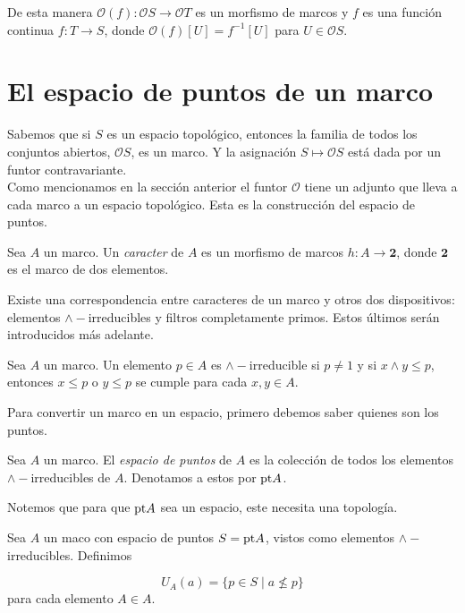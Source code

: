 De esta manera $\mathcal{O}(f)\colon \mathcal{O}S\to \mathcal{O}T$ es un morfismo de marcos y $f$ es una función continua $f\colon T\to S$, donde $\mathcal{O}(f)[U]=f^{-1}[U]$ para $U\in \mathcal{O}S$.

\section{El espacio de puntos de un marco}\label{Epuntos}

Sabemos que si $S$ es un espacio topológico, entonces la familia de todos los conjuntos abiertos, $\mathcal{O}S$, es un marco. Y la asignación $S\mapsto \mathcal{O}S$ está dada por un funtor contravariante.\\

Como mencionamos en la sección anterior el funtor $\mathcal{O}$ tiene un adjunto que lleva a cada marco a un espacio topológico. Esta es la construcción del espacio de puntos.

\begin{dfn}
    Sea $A$ un marco. Un \emph{caracter} de $A$ es un morfismo de marcos $h\colon A\to \mathbf{2}$, donde $\mathbf{2}$ es el marco de dos elementos.
\end{dfn}

Existe una correspondencia entre caracteres de un marco y otros dos dispositivos: elementos $\wedge-$irreducibles y filtros completamente primos. Estos últimos serán introducidos más adelante.

\begin{dfn}\label{infirre}
    Sea $A$ un marco. Un elemento $p\in A$ es $\wedge-$irreducible si $p\neq 1$ y si $x\wedge y\leq p$, entonces $x\leq p$ o $y\leq p$ se cumple para cada $x, y \in A$.
\end{dfn}

Para convertir un marco en un espacio, primero debemos saber quienes son los puntos.

\begin{dfn}
    Sea $A$ un marco. El \emph{espacio de puntos} de $A$ es la colección de todos los elementos $\wedge-$irreducibles de $A$. Denotamos a estos por $\mathrm{pt} A$.
\end{dfn}

Notemos que para que $\mathrm{pt} A$ sea un espacio, este necesita una topología.

\begin{dfn}
    Sea $A$ un maco con espacio de puntos $S=\mathrm{pt} A$, vistos como elementos $\wedge-$irreducibles. Definimos 

    \[
    U_A(a)=\{p\in S\mid a\nleq p\}
    \]
    para cada elemento $A\in A$. 
\end{dfn}

